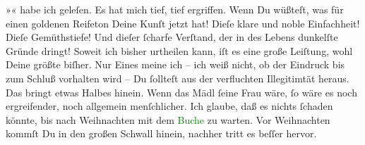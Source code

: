 \pstart
           »\label{K_L02616-12v}\label{K_L02616-12h}« habe ich geleſen. Es hat mich tief,
               tief ergriffen. Wenn Du wüßteſt, was für einen goldenen Reifeton Deine Kunſt jetzt
               hat! Dieſe klare und noble Einfachheit! Dieſe Gemüthstiefe! Und dieſer ſcharfe
               Verſtand, der in des Lebens dunkelſte Gründe dringt! Soweit ich bisher urtheilen
               kann, iſt es eine große Leiſtung, wohl Deine größte biſher. Nur Eines meine ich – ich
               weiß nicht, ob der Eindruck bis zum Schluß vorhalten wird – Du ſollteſt aus der
               verfluchten Illegitimtät heraus. Das bringt etwas {\pb}Halbes hinein. Wenn das Mädl ſeine Frau wäre, ſo \strikeout{\textcolor{gray}{×}} wäre es noch ergreifender, noch allgemein menſchlicher. Ich glaube, daß es
               nichts ſchaden könnte, bis nach Weihnachten mit dem \textcolor{green}{Buche}{}\ledrightnote{{$\rightarrow$}\textcolor{green}{Sterben. Novelle}} zu warten. Vor
                  Weihnachten kommſt Du in den großen Schwall hinein, nachher tritt es
               beſſer hervor.\pend
           

